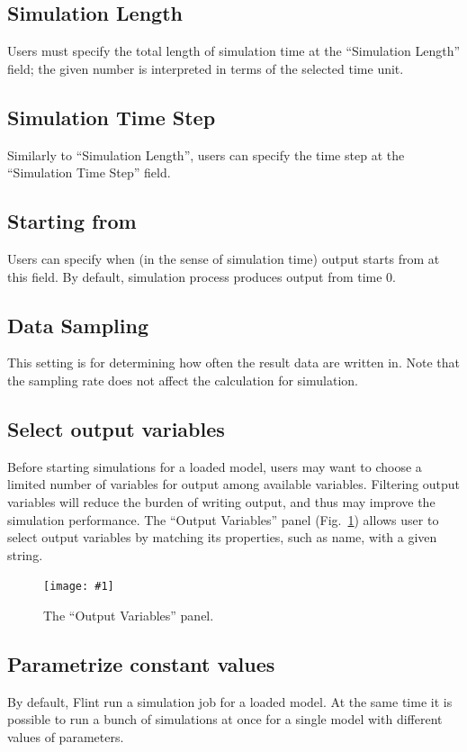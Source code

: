 \documentclass[a4paper,10pt]{report}
\newcommand\FigureOfImage[2]{\begin{figure}[h]
  \centering
  \texttt{[image: \#1]}
  \caption{#2}\label{fig:#1}
\end{figure}}
\begin{document}
\subsection{Simulation Length}
Users must specify the total length of simulation time at the ``Simulation Length''
field; the given number is interpreted in terms of the selected time unit.

\subsection{Simulation Time Step}
Similarly to ``Simulation Length'', users can specify the time step at the
``Simulation Time Step'' field.

\subsection{Starting from}
Users can specify when (in the sense of simulation time) output starts from
at this field. By default, simulation process produces output from time 0.

\subsection{Data Sampling}
This setting is for determining how often the result data are written in.
Note that the sampling rate does not affect the calculation for simulation.

\subsection{Select output variables}
Before starting simulations for a loaded model, users may want to choose a
limited number of variables for output among available variables.
Filtering output variables will reduce the burden of writing output, and thus
may improve the simulation performance.
The ``Output Variables'' panel (Fig.~\ref{fig:lr-output-variables}) allows
user to select output variables by matching its properties, such as name,
with a given string.
\FigureOfImage{lr-output-variables}{The ``Output Variables'' panel.}

\subsection{Parametrize constant values}
By default, Flint run a simulation job for a loaded model. At the same time
it is possible to run a bunch of simulations at once for a single model with
different values of parameters.
\end{document}
